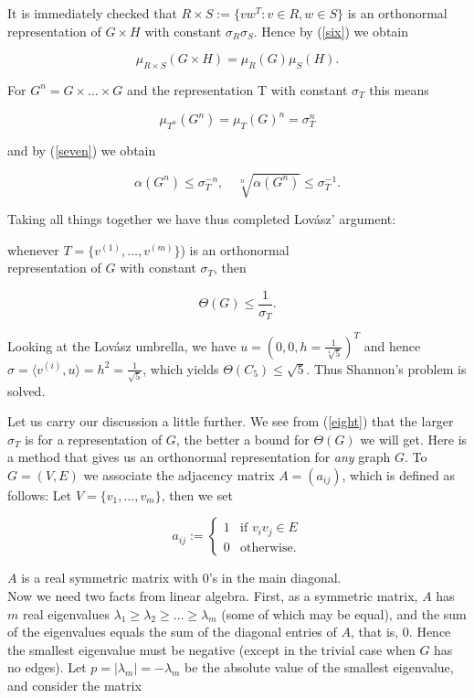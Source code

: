 It is immediately checked that $R \times S := \{vw^T : v \in R, w \in S\}$ is an
orthonormal representation of $G \times H$ with constant $\sigma_R \sigma_S$. Hence by (\ref{six}) 
we obtain 

\[
\mu_{R \times S}(G \times H) = \mu_{R}(G)\mu_{S}(H).
\]

For $G^n = G \times \ldots \times G$ and the representation T with constant $\sigma_T$ this
means 

\[
\mu_{T^n}(G^n) = \mu_{T}(G)^n = \sigma_{T}^n
\]

and by (\ref{seven}) we obtain


\[
\alpha(G^n) \leq \sigma_{T}^{-n},  \quad   \sqrt[n]{\alpha(G^n)} \leq \sigma_{T}^{-1}.
\]

Taking all things together we have thus completed Lov\'asz' argument: 


\begin{thm}\label{theorem}
whenever $T = \{v^{(1)}, \ldots, v^{(m)}\}$) is an orthonormal\\ 
representation of $G$ with constant $\sigma_T$, then

\begin{equation}
    \Theta(G) \leq {\frac{1}{\sigma_T}}. \label{eight}
\end{equation}

\end{thm}

Looking at the Lov\'asz umbrella, we have $u = (0, 0, h = {\frac{1}{\sqrt[4]{5}}})^T$ and hence
$\sigma = \langle v^{(i)}, u \rangle = h^2 = {\frac{1}{\sqrt{5}}}$, which yields $\Theta(C_5) \leq \sqrt{5}$. Thus Shannon's 
problem is solved.


\setnewpagemargins

Let us carry our discussion a little further. We see from (\ref{eight}) that the larger $\sigma_T$
is for a representation of $G$, the better a bound for $\Theta(G)$ we will get. Here 
is a method that gives us an orthonormal representation for \textit{any} graph $G$. 
To $G = (V, E)$ we associate the adjacency matrix $A = (a_{ij})$, which is 
defined as follows: Let $V = \{v_1,\ldots,v_m\}$, then we set

\[
a_{ij} := \left\{ \begin{array}{rcl}
  1 & \mbox{if $v_i v_j \in E$}\\
  0 & \mbox{otherwise.}
  \end{array}\right.
\]

$A$ is a real symmetric matrix with $0$'s in the main diagonal.\\ 
Now we need two facts from linear algebra. First, as a symmetric matrix, 
$A$ has $m$ real eigenvalues $\lambda_1 \geq \lambda_2 \geq \ldots \geq \lambda_m$ \spaceskip(some of which may be equal),
and the sum of the eigenvalues equals the sum of the diagonal 
entries of $A$, that is, 0. Hence the smallest eigenvalue must be negative 
(except in the trivial case when $G$ has no edges). {Let $p = |\lambda_m| = -\lambda_m$} be 
the absolute value of the smallest eigenvalue, and consider the matrix

